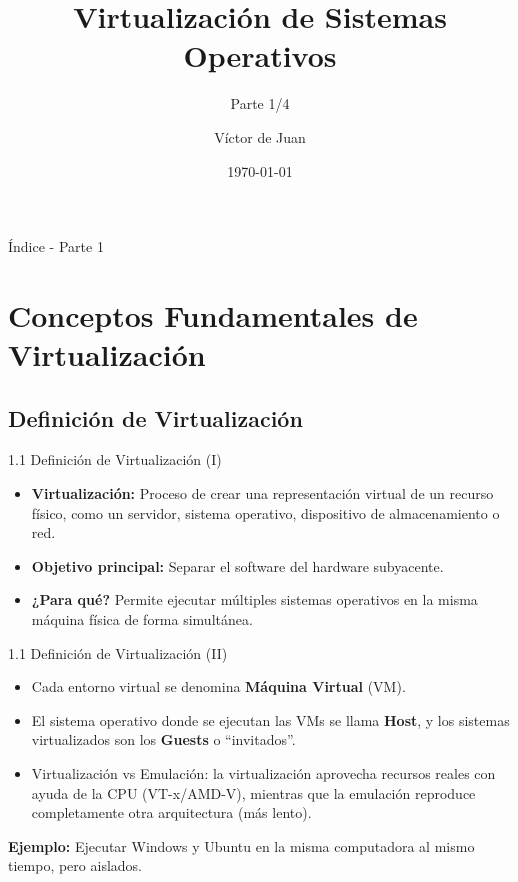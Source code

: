 \documentclass{beamer}
\title{Virtualización de Sistemas Operativos}
\subtitle{Parte 1/4}
\author{Víctor de Juan}
\date{\today}
\begin{document}
\begin{frame}
    \titlepage
\end{frame}

\begin{frame}{Índice - Parte 1}
    \tableofcontents[
    hideallsubsections]
\end{frame}

\section{Conceptos Fundamentales de Virtualización}

\subsection{Definición de Virtualización}
\begin{frame}{1.1 Definición de Virtualización (I)}
    \begin{itemize}
        \item \textbf{Virtualización:} Proceso de crear una representación virtual de un recurso físico, como un servidor, sistema operativo, dispositivo de almacenamiento o red.
        \item \textbf{Objetivo principal:} Separar el software del hardware subyacente.
        \item \textbf{¿Para qué?} Permite ejecutar múltiples sistemas operativos en la misma máquina física de forma simultánea.
    \end{itemize}
\end{frame}

\begin{frame}{1.1 Definición de Virtualización (II)}
    \begin{itemize}
        \item Cada entorno virtual se denomina \textbf{Máquina Virtual} (VM).  
        \item El sistema operativo donde se ejecutan las VMs se llama \textbf{Host}, y los sistemas virtualizados son los \textbf{Guests} o “invitados”.
        \item Virtualización vs Emulación: la virtualización aprovecha recursos reales con ayuda de la CPU (VT-x/AMD-V), mientras que la emulación reproduce completamente otra arquitectura (más lento).
    \end{itemize}
    \vspace{0.3cm}
    \textbf{Ejemplo:} Ejecutar Windows y Ubuntu en la misma computadora al mismo tiempo, pero aislados.
\end{frame}
\end{document}
